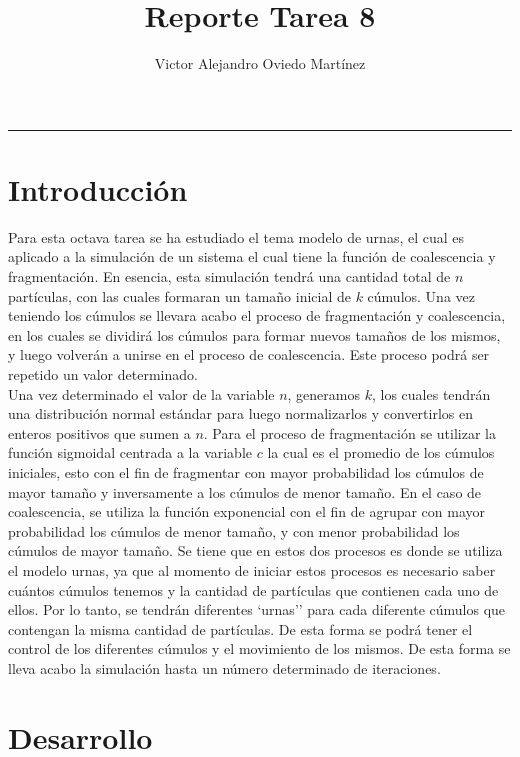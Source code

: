 \documentclass{article}
\title{Reporte Tarea 8}
\author{Victor Alejandro Oviedo Martínez}
\begin{document}
\maketitle
\hrule

\section{Introducción}\label{intro}
Para esta octava tarea \citep{DRA.P8} se ha estudiado el tema modelo de urnas, el cual es aplicado a la simulación de un sistema el cual tiene la función de coalescencia y fragmentación. En esencia, esta simulación tendrá una cantidad total de $n$ partículas, con las cuales formaran un tamaño inicial de $k$ cúmulos. Una vez teniendo los cúmulos se llevara acabo el proceso de fragmentación y coalescencia, en los cuales se dividirá los cúmulos para formar nuevos tamaños de los mismos, y luego volverán a unirse en el proceso de coalescencia. Este proceso podrá ser repetido un valor determinado.\\

Una vez determinado el valor de la variable $n$, generamos $k$, los cuales tendrán una distribución normal estándar para luego normalizarlos y convertirlos en enteros positivos que sumen a $n$. Para el proceso de fragmentación se utilizar la función sigmoidal centrada a la variable $c$ la cual es el promedio de los cúmulos iniciales, esto con el fin de fragmentar con mayor probabilidad los cúmulos de mayor tamaño y inversamente a los cúmulos de menor tamaño. En el caso de coalescencia, se utiliza la función exponencial con el fin de agrupar con mayor probabilidad los cúmulos de menor tamaño, y con menor probabilidad los cúmulos de mayor tamaño. Se tiene que en estos dos procesos es donde se utiliza el modelo urnas, ya que al momento de iniciar estos procesos es necesario saber cuántos cúmulos tenemos y la cantidad de partículas que contienen cada uno de ellos. Por lo tanto, se tendrán diferentes `urnas'' para cada diferente cúmulos que contengan la misma cantidad de partículas. De esta forma se podrá tener el control de los diferentes cúmulos y el movimiento de los mismos. De esta forma se lleva  acabo la simulación hasta un número determinado de iteraciones.\\




\section{Desarrollo}
\end{document}
